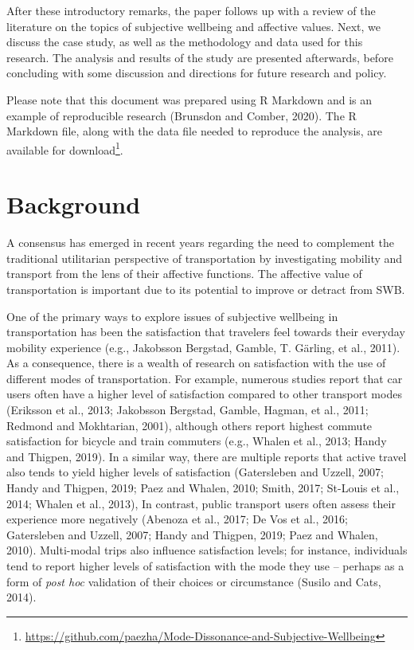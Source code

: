 \documentclass[]{elsarticle} %
\begin{document}
After these introductory remarks, the paper follows up with a review of
the literature on the topics of subjective wellbeing and affective
values. Next, we discuss the case study, as well as the methodology and
data used for this research. The analysis and results of the study are
presented afterwards, before concluding with some discussion and
directions for future research and policy.

Please note that this document was prepared using R Markdown and is an
example of reproducible research (Brunsdon and Comber, 2020). The R
Markdown file, along with the data file needed to reproduce the
analysis, are available for
download\footnote{\url{https://github.com/paezha/Mode-Dissonance-and-Subjective-Wellbeing}}.

\hypertarget{background}{%
\section{Background}\label{background}}

A consensus has emerged in recent years regarding the need to complement
the traditional utilitarian perspective of transportation by
investigating mobility and transport from the lens of their affective
functions. The affective value of transportation is important due to its
potential to improve or detract from SWB.

One of the primary ways to explore issues of subjective wellbeing in
transportation has been the satisfaction that travelers feel towards
their everyday mobility experience (e.g., Jakobsson Bergstad, Gamble, T.
Gärling, et al., 2011). As a consequence, there is a wealth of research
on satisfaction with the use of different modes of transportation. For
example, numerous studies report that car users often have a higher
level of satisfaction compared to other transport modes (Eriksson et
al., 2013; Jakobsson Bergstad, Gamble, Hagman, et al., 2011; Redmond and
Mokhtarian, 2001), although others report highest commute satisfaction
for bicycle and train commuters (e.g., Whalen et al., 2013; Handy and
Thigpen, 2019). In a similar way, there are multiple reports that active
travel also tends to yield higher levels of satisfaction (Gatersleben
and Uzzell, 2007; Handy and Thigpen, 2019; Paez and Whalen, 2010; Smith,
2017; St-Louis et al., 2014; Whalen et al., 2013), In contrast, public
transport users often assess their experience more negatively (Abenoza
et al., 2017; De Vos et al., 2016; Gatersleben and Uzzell, 2007; Handy
and Thigpen, 2019; Paez and Whalen, 2010). Multi-modal trips also
influence satisfaction levels; for instance, individuals tend to report
higher levels of satisfaction with the mode they use -- perhaps as a
form of \emph{post hoc} validation of their choices or circumstance
(Susilo and Cats, 2014).
\end{document}
